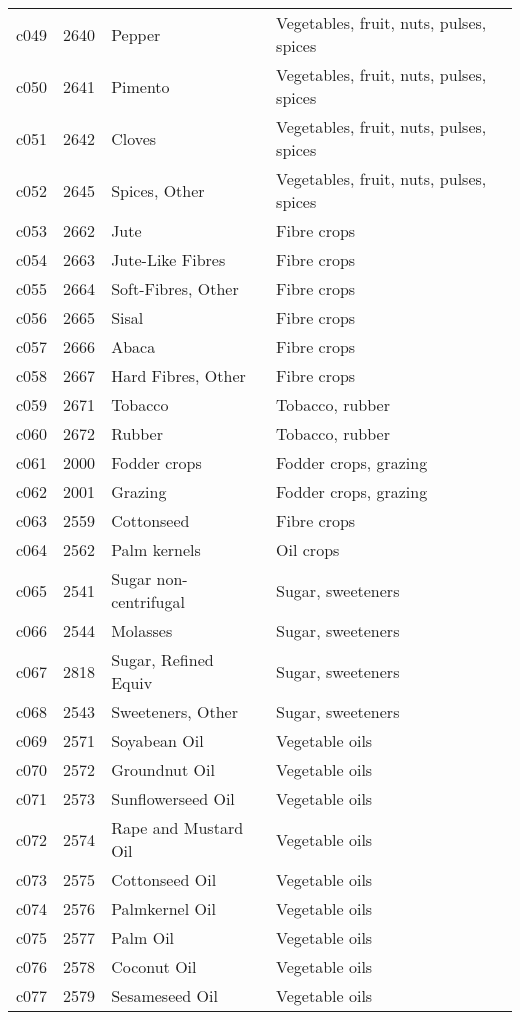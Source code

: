 \documentclass[]{article}
\begin{document}
\begin{longtable}[t]{lrll}
c049 & 2640 & Pepper & Vegetables, fruit, nuts, pulses, spices\\
c050 & 2641 & Pimento & Vegetables, fruit, nuts, pulses, spices\\
\addlinespace
c051 & 2642 & Cloves & Vegetables, fruit, nuts, pulses, spices\\
c052 & 2645 & Spices, Other & Vegetables, fruit, nuts, pulses, spices\\
c053 & 2662 & Jute & Fibre crops\\
c054 & 2663 & Jute-Like Fibres & Fibre crops\\
c055 & 2664 & Soft-Fibres, Other & Fibre crops\\
\addlinespace
c056 & 2665 & Sisal & Fibre crops\\
c057 & 2666 & Abaca & Fibre crops\\
c058 & 2667 & Hard Fibres, Other & Fibre crops\\
c059 & 2671 & Tobacco & Tobacco, rubber\\
c060 & 2672 & Rubber & Tobacco, rubber\\
\addlinespace
c061 & 2000 & Fodder crops & Fodder crops, grazing\\
c062 & 2001 & Grazing & Fodder crops, grazing\\
c063 & 2559 & Cottonseed & Fibre crops\\
c064 & 2562 & Palm kernels & Oil crops\\
c065 & 2541 & Sugar non-centrifugal & Sugar, sweeteners\\
\addlinespace
c066 & 2544 & Molasses & Sugar, sweeteners\\
c067 & 2818 & Sugar, Refined Equiv & Sugar, sweeteners\\
c068 & 2543 & Sweeteners, Other & Sugar, sweeteners\\
c069 & 2571 & Soyabean Oil & Vegetable oils\\
c070 & 2572 & Groundnut Oil & Vegetable oils\\
\addlinespace
c071 & 2573 & Sunflowerseed Oil & Vegetable oils\\
c072 & 2574 & Rape and Mustard Oil & Vegetable oils\\
c073 & 2575 & Cottonseed Oil & Vegetable oils\\
c074 & 2576 & Palmkernel Oil & Vegetable oils\\
c075 & 2577 & Palm Oil & Vegetable oils\\
\addlinespace
c076 & 2578 & Coconut Oil & Vegetable oils\\
c077 & 2579 & Sesameseed Oil & Vegetable oils\\

\end{longtable}
\end{document}
